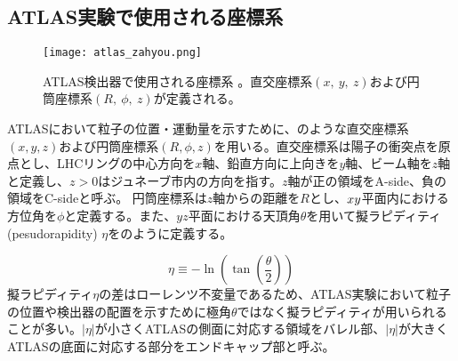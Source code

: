 \subsection{ATLAS実験で使用される座標系}
\label{sec:zahyoukei}
\begin{figure}[tbp]
  \centering
  \texttt{[image: atlas\_zahyou.png]}
  \caption[ATLAS検出器]{ATLAS検出器で使用される座標系 \cite{ATLAS}。直交座標系$(x,\ y,\ z)$および円筒座標系$(R,\ \phi,\ z)$が定義される。}
  \label{fig:atlaszahyou}
\end{figure}

ATLASにおいて粒子の位置・運動量を示すために、のような直交座標系$\left( x, y, z \right)$および円筒座標系$\left( R, \phi, z \right)$を用いる。直交座標系は陽子の衝突点を原点とし、LHCリングの中心方向を$x$軸、鉛直方向に上向きを$y$軸、ビーム軸を$z$軸と定義し、$z>0$はジュネーブ市内の方向を指す。$z$軸が正の領域をA-side、負の領域をC-sideと呼ぶ。
円筒座標系は$z$軸からの距離を$R$とし、$x\-y$平面内における方位角を$\phi$と定義する。また、$yz$平面における天頂角$\theta$を用いて擬ラピディティ(pesudorapidity) $\eta$をのように定義する。

\begin{equation}
  \label{eq:eta}
  \eta \equiv  -\ln\left( \tan{\left( \frac{\theta}{2} \right)} \right)
\end{equation}
擬ラピディティ$\eta$の差はローレンツ不変量であるため、ATLAS実験において粒子の位置や検出器の配置を示すために極角$\theta$ではなく擬ラピディティが用いられることが多い。$|\eta|$が小さくATLASの側面に対応する領域をバレル部、$|\eta|$が大きくATLASの底面に対応する部分をエンドキャップ部と呼ぶ。

